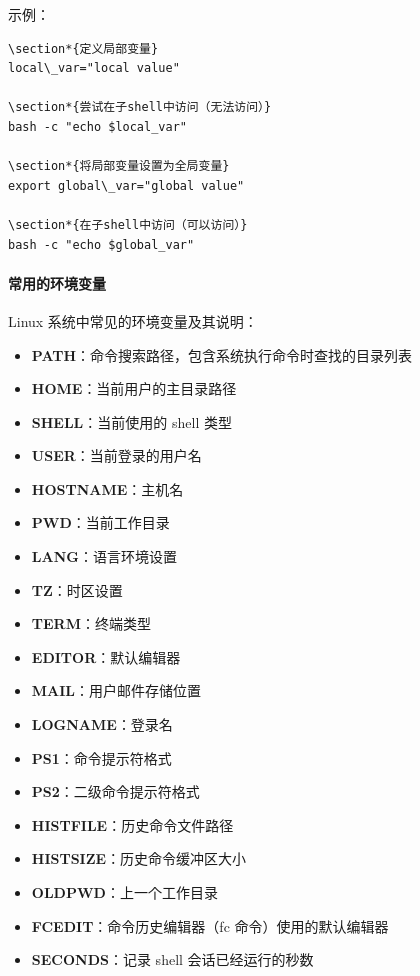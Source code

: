 \documentclass[12pt,UTF8]{ctexbook}
\begin{document}
示例：
\begin{verbatim}
\section*{定义局部变量}
local\_var="local value"

\section*{尝试在子shell中访问（无法访问）}
bash -c "echo $local_var"

\section*{将局部变量设置为全局变量}
export global\_var="global value"

\section*{在子shell中访问（可以访问）}
bash -c "echo $global_var"
\end{verbatim}

\paragraph{常用的环境变量}
Linux 系统中常见的环境变量及其说明：

\begin{itemize}
    \item \textbf{PATH}：命令搜索路径，包含系统执行命令时查找的目录列表
    \item \textbf{HOME}：当前用户的主目录路径
    \item \textbf{SHELL}：当前使用的 shell 类型
    \item \textbf{USER}：当前登录的用户名
    \item \textbf{HOSTNAME}：主机名
    \item \textbf{PWD}：当前工作目录
    \item \textbf{LANG}：语言环境设置
    \item \textbf{TZ}：时区设置
    \item \textbf{TERM}：终端类型
    \item \textbf{EDITOR}：默认编辑器
    \item \textbf{MAIL}：用户邮件存储位置
    \item \textbf{LOGNAME}：登录名
    \item \textbf{PS1}：命令提示符格式
    \item \textbf{PS2}：二级命令提示符格式
    \item \textbf{HISTFILE}：历史命令文件路径
    \item \textbf{HISTSIZE}：历史命令缓冲区大小
    \item \textbf{OLDPWD}：上一个工作目录
    \item \textbf{FCEDIT}：命令历史编辑器（fc 命令）使用的默认编辑器
    \item \textbf{SECONDS}：记录 shell 会话已经运行的秒数
\end{itemize}
\end{document}
